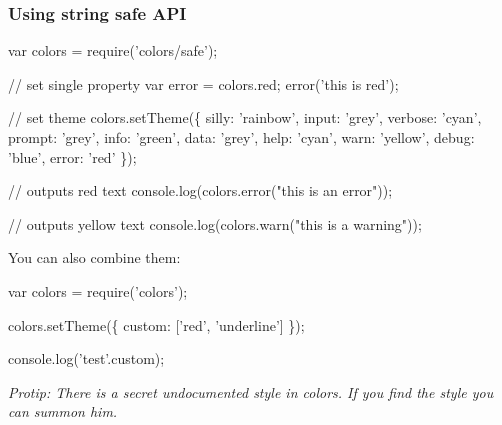 \subsubsection*{Using string safe A\+PI}


\begin{DoxyCode}
var colors = require('colors/safe');

// set single property
var error = colors.red;
error('this is red');

// set theme
colors.setTheme(\{
  silly: 'rainbow',
  input: 'grey',
  verbose: 'cyan',
  prompt: 'grey',
  info: 'green',
  data: 'grey',
  help: 'cyan',
  warn: 'yellow',
  debug: 'blue',
  error: 'red'
\});

// outputs red text
console.log(colors.error("this is an error"));

// outputs yellow text
console.log(colors.warn("this is a warning"));
\end{DoxyCode}


You can also combine them\+:


\begin{DoxyCode}
var colors = require('colors');

colors.setTheme(\{
  custom: ['red', 'underline']
\});

console.log('test'.custom);
\end{DoxyCode}


{\itshape Protip\+: There is a secret undocumented style in {\ttfamily colors}. If you find the style you can summon him.} 